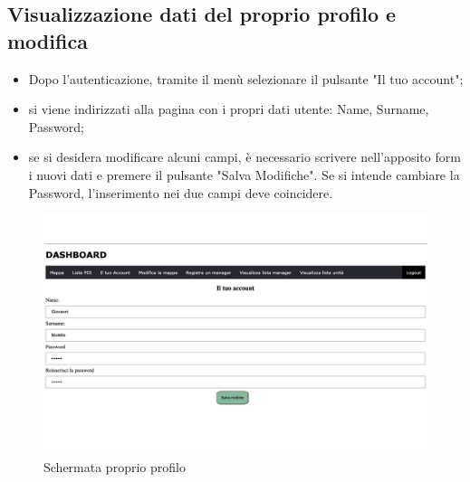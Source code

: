 \subsection{Visualizzazione dati del proprio profilo e modifica}
\begin{itemize}
    \item Dopo l'autenticazione, tramite il menù selezionare il pulsante "Il tuo account";
    \item si viene indirizzati alla pagina con i propri dati utente: Name, Surname, Password;
    \item se si desidera modificare alcuni campi, è necessario scrivere nell'apposito form i nuovi dati e premere il pulsante "Salva Modifiche". Se si intende cambiare la Password, l'inserimento nei due campi deve coincidere.
\end{itemize}
\begin{figure}[H]
    \centering
    \includegraphics[scale=0.12]{res/images/account_user.png}
    \caption{Schermata proprio profilo}
\end{figure}

